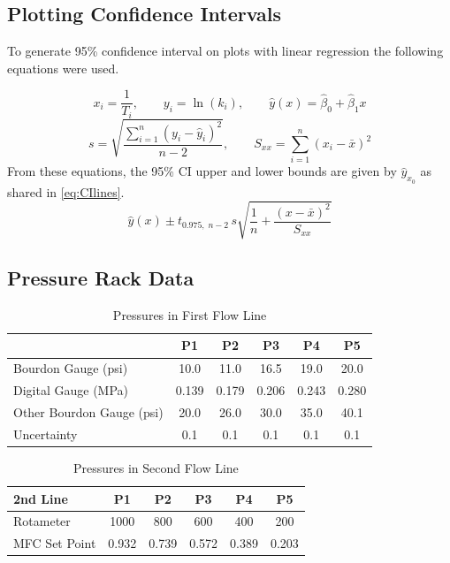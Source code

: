 \subsection{Plotting Confidence Intervals}
\label{app:plotCI}
To generate 95\% confidence interval on plots with linear regression the following equations were used.

\[
x_i=\frac{1}{T_i},\qquad y_i=\ln(k_i),\qquad \hat y(x)=\hat\beta_0+\hat\beta_1 x
\]
\[
s=\sqrt{\frac{\sum_{i=1}^{n}(y_i-\hat y_i)^2}{n-2}},\qquad
S_{xx}=\sum_{i=1}^{n}(x_i-\bar x)^2
\]
From these equations, the 95\% CI upper and lower bounds are given by $\hat{y}_{x_0}$ as shared in \cref{eq:CIlines}.
\begin{equation}
    \hat y(x)\pm t_{0.975,\;n-2}\,s\sqrt{\frac{1}{n}+\frac{(x-\bar x)^2}{S_{xx}}} \label{eq:CIlines}
\end{equation}

\subsection{Pressure Rack Data}
\label{app:pressure}

\begin{table}[H]
    \centering
    \caption{Pressures in First Flow Line}
    \label{tab:firstflowline}
    \begin{tabular}{lccccc}
        \toprule
        & P1 & P2 & P3 & P4 & P5 \\
        \midrule
        Bourdon Gauge (psi)        & 10.0 & 11.0 & 16.5 & 19.0 & 20.0 \\
        Digital Gauge (MPa)        & 0.139 & 0.179 & 0.206 & 0.243 & 0.280 \\
        Other Bourdon Gauge (psi)  & 20.0 & 26.0 & 30.0 & 35.0 & 40.1 \\
        Uncertainty                & 0.1 & 0.1 & 0.1 & 0.1 & 0.1 \\
        \bottomrule
    \end{tabular}
\end{table}

\begin{table}[H]
    \centering
    \caption{Pressures in Second Flow Line}
    \label{tab:secondflowline}
    \begin{tabular}{lccccc}
        \toprule
        2nd Line & P1 & P2 & P3 & P4 & P5 \\
        \midrule
        Rotameter     & 1000 & 800 & 600 & 400 & 200 \\
        MFC Set Point & 0.932 & 0.739 & 0.572 & 0.389 & 0.203 \\
        \bottomrule
    \end{tabular}
\end{table}

